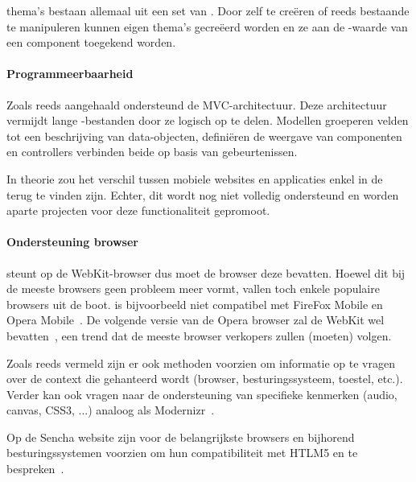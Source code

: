 \st{} thema's bestaan allemaal uit een set van .  
Door zelf  te creëren of reeds bestaande te manipuleren kunnen eigen thema's gecreëerd worden en ze aan de -waarde van een component toegekend worden.

\paragraph{Programmeerbaarheid}
\label{sec:sencha-programeerbaarheid}
Zoals reeds aangehaald ondersteund \st{} de MVC-architectuur.  
Deze architectuur vermijdt lange \js{}-bestanden door ze logisch op te delen.  
Modellen groeperen velden tot een beschrijving van data-objecten,  definiëren de weergave van componenten en controllers verbinden beide op basis van gebeurtenissen.

In theorie zou het verschil tussen mobiele websites en applicaties enkel in de  terug te vinden zijn.  
Echter,  dit wordt nog niet volledig ondersteund en worden aparte projecten voor deze functionaliteit gepromoot.

\paragraph{Ondersteuning browser}
\st{} steunt op de WebKit-browser  dus moet de browser deze bevatten.  
Hoewel dit bij de meeste browsers geen probleem meer vormt, vallen toch enkele populaire browsers uit de boot.  
\st{} is bijvoorbeeld niet compatibel met FireFox Mobile en Opera Mobile~\cite{JohnEClark2012}.
De volgende versie van de Opera browser zal de WebKit  wel bevatten~\cite{Wokke2013}, een trend dat de meeste browser verkopers zullen (moeten) volgen.

Zoals reeds vermeld zijn er ook methoden voorzien om informatie op te vragen over de context die gehanteerd wordt (browser, besturingssysteem, toestel, etc.).  
Verder kan \st{} ook vragen naar de ondersteuning van specifieke kenmerken (audio,  canvas,  CSS3, ...)  analoog als Modernizr~\cite{Modernizr2012}.  

Op de Sencha website zijn voor de belangrijkste browsers en bijhorend besturingssystemen  voorzien om hun compatibiliteit met HTLM5 en \st{} te bespreken~\cite{Inc.}.


